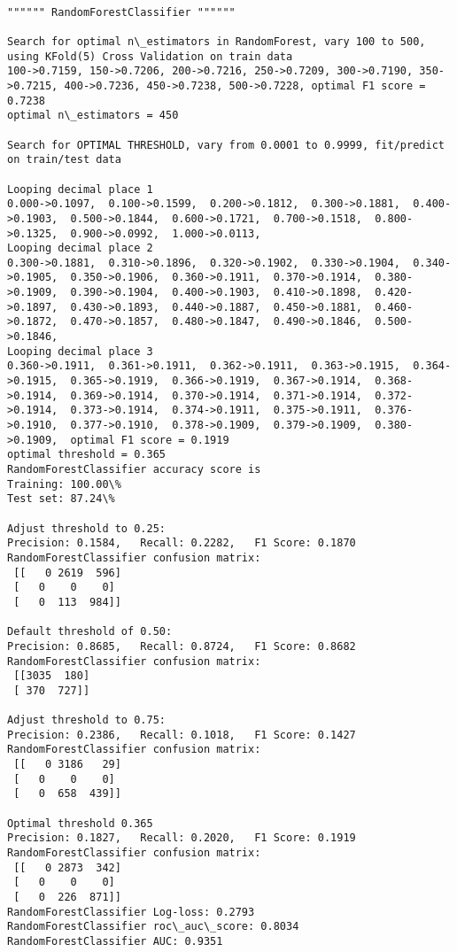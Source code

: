 \documentclass[11pt]{article}
\begin{document}
    \begin{Verbatim}[commandchars=\\\{\}]

"""""" RandomForestClassifier """"""

Search for optimal n\_estimators in RandomForest, vary 100 to 500, using KFold(5) Cross Validation on train data
100->0.7159, 150->0.7206, 200->0.7216, 250->0.7209, 300->0.7190, 350->0.7215, 400->0.7236, 450->0.7238, 500->0.7228, optimal F1 score = 0.7238
optimal n\_estimators = 450

Search for OPTIMAL THRESHOLD, vary from 0.0001 to 0.9999, fit/predict on train/test data

Looping decimal place 1
0.000->0.1097,  0.100->0.1599,  0.200->0.1812,  0.300->0.1881,  0.400->0.1903,  0.500->0.1844,  0.600->0.1721,  0.700->0.1518,  0.800->0.1325,  0.900->0.0992,  1.000->0.0113,  
Looping decimal place 2
0.300->0.1881,  0.310->0.1896,  0.320->0.1902,  0.330->0.1904,  0.340->0.1905,  0.350->0.1906,  0.360->0.1911,  0.370->0.1914,  0.380->0.1909,  0.390->0.1904,  0.400->0.1903,  0.410->0.1898,  0.420->0.1897,  0.430->0.1893,  0.440->0.1887,  0.450->0.1881,  0.460->0.1872,  0.470->0.1857,  0.480->0.1847,  0.490->0.1846,  0.500->0.1846,  
Looping decimal place 3
0.360->0.1911,  0.361->0.1911,  0.362->0.1911,  0.363->0.1915,  0.364->0.1915,  0.365->0.1919,  0.366->0.1919,  0.367->0.1914,  0.368->0.1914,  0.369->0.1914,  0.370->0.1914,  0.371->0.1914,  0.372->0.1914,  0.373->0.1914,  0.374->0.1911,  0.375->0.1911,  0.376->0.1910,  0.377->0.1910,  0.378->0.1909,  0.379->0.1909,  0.380->0.1909,  optimal F1 score = 0.1919
optimal threshold = 0.365
RandomForestClassifier accuracy score is
Training: 100.00\%
Test set: 87.24\%

Adjust threshold to 0.25:
Precision: 0.1584,   Recall: 0.2282,   F1 Score: 0.1870
RandomForestClassifier confusion matrix: 
 [[   0 2619  596]
 [   0    0    0]
 [   0  113  984]]

Default threshold of 0.50:
Precision: 0.8685,   Recall: 0.8724,   F1 Score: 0.8682
RandomForestClassifier confusion matrix: 
 [[3035  180]
 [ 370  727]]

Adjust threshold to 0.75:
Precision: 0.2386,   Recall: 0.1018,   F1 Score: 0.1427
RandomForestClassifier confusion matrix: 
 [[   0 3186   29]
 [   0    0    0]
 [   0  658  439]]

Optimal threshold 0.365
Precision: 0.1827,   Recall: 0.2020,   F1 Score: 0.1919
RandomForestClassifier confusion matrix: 
 [[   0 2873  342]
 [   0    0    0]
 [   0  226  871]]
RandomForestClassifier Log-loss: 0.2793
RandomForestClassifier roc\_auc\_score: 0.8034
RandomForestClassifier AUC: 0.9351

    \end{Verbatim}
\end{document}
